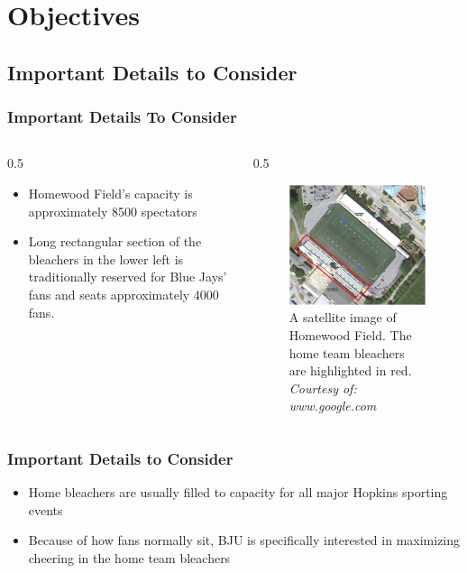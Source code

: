 \documentclass[compress,handout,10pt]{beamer}
\let\olditem\item
\renewcommand{\item}{\setlength{\itemsep}{0.5\baselineskip}\olditem}
\begin{document}
\section {Objectives}

\subsection{Important Details to Consider}

\begin{frame}
	\frametitle {Important Details To Consider}
		\begin {columns}
			\begin {column}{0.5\textwidth}
				\begin{itemize}
					\item Homewood Field's capacity is approximately 8500 spectators \cite{wiki}
					\item Long rectangular section of the bleachers in the lower left is traditionally reserved for Blue Jays' fans and seats approximately 4000 fans.
				\end {itemize}
			\end {column}
			\begin {column}{0.5\textwidth}
			\begin {figure}
				\begin{center}
    			\includegraphics [width=2in] {Bleachers.png}
    			\caption {{\tiny A satellite image of Homewood Field. The home team bleachers are highlighted in red. \textit{Courtesy of: www.google.com}}}
    		\end{center}
    	\end{figure}	
			\end {column}
		\end {columns}
\end{frame}

\begin{frame}
	\frametitle{Important Details to Consider}
		\begin{itemize}
			\item Home bleachers are usually filled to capacity for all major Hopkins sporting events
			\item Because of how fans normally sit, BJU is specifically interested in maximizing cheering in the home team bleachers
		\end{itemize}
\end{frame}
\end{document}
